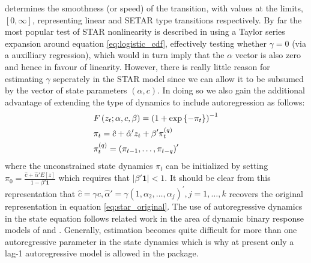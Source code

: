 determines the smoothness (or speed) of the transition, with values at the limits, 
$\left[ {0,\infty } \right]$, representing linear and SETAR type transitions 
respectively. By far the most popular test of STAR nonlinearity is described 
in \cite{Luukkonen1988} using a Taylor series expansion around
equation \ref{eq:logistic_cdf}, effectively testing whether $\gamma=0$ (via
a auxilliary regression), which would in turn imply that the $\alpha$ vector is
also zero and hence in favour of linearity. 
However, there is really little reason for estimating $\gamma$ seperately in the
STAR model since we can allow it to be subsumed by the vector of state 
parameters $\left(\alpha, c \right)$. In doing so we also gain the additional
advantage of extending the type of dynamics to include autoregression as
follows:
\begin{equation}\label{eq:star_new}
\begin{gathered}
  F\left( {{z_t};\alpha ,c,\beta} \right) = {\left( {1 + \exp \left\{ -{{\pi
  _t}} \right\}} \right)^{ - 1}} \hfill \\
  {\pi _t} = \hat c + \hat \alpha '{z_t} + \beta '\pi _t^{\left( q \right)} \hfill \\
  \pi _t^{\left( q \right)} = {\left( {{\pi _{t - 1}},\dots,{\pi _{t - q}}}
  \right)^\prime } \hfill \\
\end{gathered}
\end{equation}
where the unconstrained state dynamics $\pi_t$ can be initialized by setting
${\pi _0} =\frac{{\hat c + \hat \alpha 'E\left[ z \right]}}{{1 - \beta
'{\mathbf{1}}}}$ which requires that $\left| {\beta '{\mathbf{1}}} \right| < 1$.
It should be  clear from this representation that  $\hat c = \gamma c,\hat
\alpha ' = \gamma {\left( {1,{\alpha _2},\dots,{\alpha _j}} \right)^\prime },j =
1,\dots,k$ recovers the  original representation in equation
\ref{eq:star_original}. The use of  autoregressive dynamics in the state
equation follows related work in the  area of dynamic binary response models of 
\cite{Kauppi2008} and \cite{Nyberg2010}.
Generally, estimation becomes quite difficult for more than one autoregressive
parameter in the state dynamics which is why at present only a lag-1
autoregressive model is allowed in the package.

